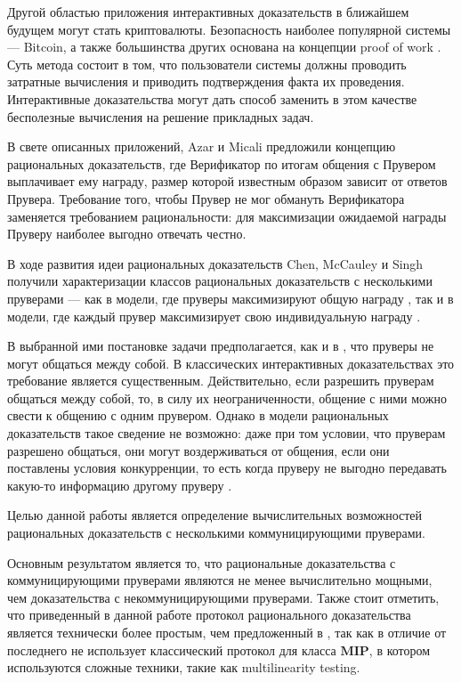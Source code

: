\documentclass[14pt, a4paper, russian]{report}
\begin{document}
Другой областью приложения интерактивных доказательств в ближайшем будущем могут стать криптовалюты. Безопасность наиболее популярной системы --- Bitcoin, а также большинства других основана на концепции proof of work \cite{nakamoto2008bitcoin}. Суть метода состоит в том, что пользователи системы должны проводить затратные вычисления и приводить подтверждения факта их проведения. Интерактивные доказательства могут дать способ заменить в этом качестве бесполезные вычисления на решение прикладных задач.

В свете описанных приложений, Azar и Micali \cite{azar2012rational} предложили концепцию рациональных доказательств, где Верификатор по итогам общения с Прувером выплачивает ему награду, размер которой известным образом зависит от ответов Прувера. Требование того, чтобы Прувер не мог обмануть Верификатора заменяется требованием рациональности: для максимизации ожидаемой награды Пруверу наиболее выгодно отвечать честно.

В ходе развития идеи рациональных доказательств Chen, McCauley и Singh получили характеризации классов рациональных доказательств с несколькими пруверами --- как в модели, где пруверы максимизируют общую награду \cite{chen2016mrip}, так и в модели, где каждый прувер максимизирует свою индивидуальную награду \cite{chen2017noncoop}.

В выбранной ими постановке задачи предполагается, как и в \cite{babai1991mip}, что пруверы не могут общаться между собой. В классических интерактивных доказательствах это требование является существенным. Действительно, если разрешить пруверам общаться между собой, то, в силу их неограниченности, общение с ними можно свести к общению с одним прувером. Однако в модели рациональных доказательств такое сведение не возможно: даже при том условии, что пруверам разрешено общаться, они могут воздерживаться от общения, если они поставлены условия конкурренции, то есть когда пруверу не выгодно передавать какую-то информацию другому пруверу .

Целью данной работы является определение вычислительных возможностей рациональных доказательств с несколькими коммуницирующими пруверами.

Основным результатом является то, что рациональные доказательства с коммуницирующими пруверами являются не менее вычислительно мощными, чем доказательства с некоммуницирующими пруверами. Также стоит отметить, что приведенный в данной работе протокол рационального доказательства является технически более простым, чем предложенный в \cite{chen2017noncoop}, так как в отличие от последнего не использует классический протокол для класса $\textbf{MIP}$, в котором используются сложные техники, такие как multilinearity testing.
\end{document}
